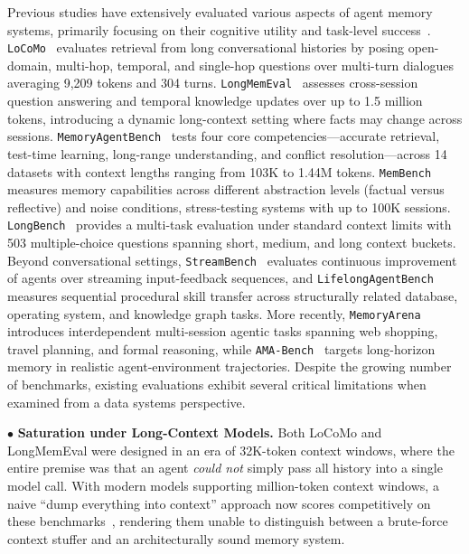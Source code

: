 Previous studies have extensively evaluated various aspects of agent memory systems, primarily focusing on their cognitive utility and task-level success~\cite{maharana2024locomo, wu2024longmemeval, memoryagentbench2026, tan2025membench}.  \texttt{LoCoMo}~\cite{maharana2024locomo} evaluates retrieval from long conversational histories by posing open-domain, multi-hop, temporal, and single-hop questions over multi-turn dialogues averaging 9,209 tokens and 304 turns. \texttt{LongMemEval}~\cite{wu2024longmemeval} assesses cross-session question answering and temporal knowledge updates over up to 1.5 million tokens, introducing a dynamic long-context setting where facts may change across sessions. \texttt{MemoryAgentBench}~\cite{memoryagentbench2026} tests four core competencies---accurate retrieval, test-time learning, long-range understanding, and conflict resolution---across 14 datasets with context lengths ranging from 103K to 1.44M tokens. \texttt{MemBench}~\cite{tan2025membench} measures memory capabilities across different abstraction levels (factual versus reflective) and noise conditions, stress-testing systems with up to 100K sessions. \texttt{LongBench}~\cite{bai2023longbench} provides a multi-task evaluation under standard context limits with 503 multiple-choice questions spanning short, medium, and long context buckets. Beyond conversational settings, \texttt{StreamBench}~\cite{wu2024streambench} evaluates continuous improvement of agents over streaming input-feedback sequences, and \texttt{LifelongAgentBench}~\cite{lifelongagentbench2025} measures sequential procedural skill transfer across structurally related database, operating system, and knowledge graph tasks. More recently, \texttt{MemoryArena}~\cite{memoryarena2026} introduces interdependent multi-session agentic tasks spanning web shopping, travel planning, and formal reasoning, while \texttt{AMA-Bench}~\cite{amabench2026} targets long-horizon memory in realistic agent-environment trajectories. Despite the growing number of benchmarks, existing evaluations exhibit several critical limitations when examined from a data systems perspective.

\noindent $\bullet$ \textbf{Saturation under Long-Context Models.} Both LoCoMo and LongMemEval were designed in an era of 32K-token context windows, where the entire premise was that an agent \textit{could not} simply pass all history into a single model call. With modern models supporting million-token context windows, a naive ``dump everything into context'' approach now scores competitively on these benchmarks~\cite{chhikara2025mem0}, rendering them unable to distinguish between a brute-force context stuffer and an architecturally sound memory system.

